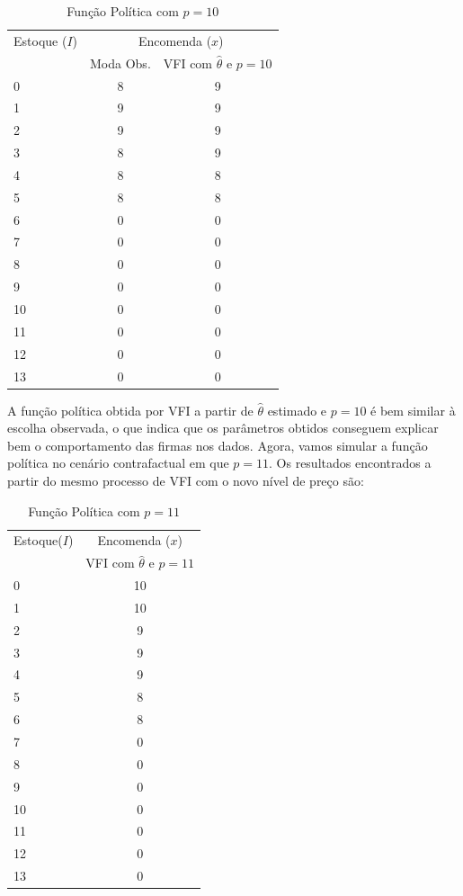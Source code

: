 \documentclass{article}
\begin{document}
\begin{table}[H]
    \centering
    \begin{tabular}{lcc}
    \hline
    Estoque ($I$) & \multicolumn{2}{c}{Encomenda ($x$)} \\
    & Moda Obs. & VFI com $\widehat{\theta}$ e $p=10$\\
    \hline \hline
       0  & 8 & 9 \\
       1  &  9 & 9 \\
       2 & 9 & 9 \\
       3 & 8 & 9  \\
       4 & 8 & 8  \\
       5 & 8 & 8  \\
       6 & 0 & 0  \\
       7 & 0 & 0 \\
       8 & 0 & 0 \\
       9 & 0 & 0 \\
       10 & 0 & 0 \\
       11 & 0 & 0 \\
       12 & 0 & 0 \\
       13 & 0 & 0 \\
    \end{tabular}
    \caption{Função Política com $p=10$}
    \label{tab:VFI1}
\end{table}

A função política obtida por VFI a partir de $\hat{\theta}$ estimado e $p=10$ é bem similar à escolha observada, o que indica que os parâmetros obtidos conseguem explicar bem o comportamento das firmas nos dados. Agora, vamos simular a função política no cenário contrafactual em que $p=11$. Os resultados encontrados a partir do mesmo processo de VFI com o novo nível de preço são:


\begin{table}[H]
    \centering
    \begin{tabular}{lc}
    \hline
       Estoque($I$)  & Encomenda ($x$) \\
       & VFI com $\hat{\theta}$ e $p=11$ \\
       \hline\hline
        0 & 10\\
        1 & 10\\
        2 & 9\\
        3 & 9\\
        4 & 9\\
        5 & 8\\
        6 & 8\\
        7 & 0\\
        8 & 0\\
        9 & 0\\
        10 & 0\\
        11 & 0\\
        12 & 0\\
        13 & 0\\
    \end{tabular}
    \caption{Função Política com $p=11$}
    \label{tab:my_label}
\end{table}
\end{document}
